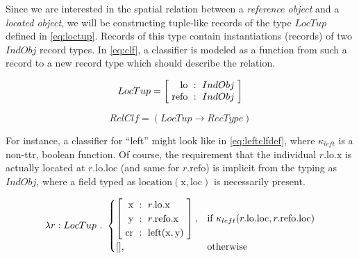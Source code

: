 Since we are interested in the spatial relation between a \textit{reference object} and a \textit{located object}, we will be constructing tuple-like records of the type $LocTup$ defined in \autoref{eq:loctup}.
Records of this type contain instantiations (records) of two $IndObj$ record types.
In \autoref{eq:clf}, a classifier is modeled as a function from such a record to a new record type which should describe the relation.

\begin{equation}\label{eq:loctup}
LocTup = \rec{
    \text{lo} &:& IndObj \\
    \text{refo} &:& IndObj \\
    }
\end{equation}

\begin{equation}\label{eq:clf}
RelClf = ( LocTup \rightarrow RecType )
\end{equation}

For instance, a classifier for ``left'' might look like in \autoref{eq:leftclfdef}, where $\kappa_{left}$ is a non-\gls{ttr}, boolean function.
Of course, the requirement that the individual $r.\text{lo}.\text{x}$ is actually located at $r.\text{lo}.\text{loc}$ (and same for $r.\text{refo}$) is implicit from the typing as $IndObj$, where a field typed as $\text{location}(\text{x}, \text{loc})$ is necessarily present.

\begin{equation}\label{eq:leftclfdef}
\lambda r : LocTup \ .\ 
\begin{cases}
\rec{
    \text{x} &:& r.\text{lo}.\text{x} \\
    \text{y} &:& r.\text{refo}.\text{x} \\
    \text{cr} &:& \text{left}(\text{x}, \text{y}) \\
},
& \text{if } \kappa_{left}(r.\text{lo}.\text{loc}, r.\text{refo}.\text{loc}) \\
[], & \text{otherwise}
\end{cases}
\end{equation}



